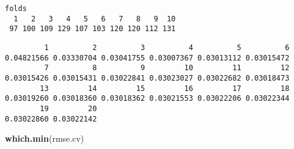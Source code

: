 \documentclass[]{article}
\newenvironment{Shaded}{\begin{snugshade}}{\end{snugshade}}
\newcommand{\KeywordTok}[1]{\textcolor[rgb]{0.13,0.29,0.53}{\textbf{#1}}}
\newcommand{\DataTypeTok}[1]{\textcolor[rgb]{0.13,0.29,0.53}{#1}}
\newcommand{\DecValTok}[1]{\textcolor[rgb]{0.00,0.00,0.81}{#1}}
\newcommand{\StringTok}[1]{\textcolor[rgb]{0.31,0.60,0.02}{#1}}
\newcommand{\OtherTok}[1]{\textcolor[rgb]{0.56,0.35,0.01}{#1}}
\newcommand{\ControlFlowTok}[1]{\textcolor[rgb]{0.13,0.29,0.53}{\textbf{#1}}}
\newcommand{\OperatorTok}[1]{\textcolor[rgb]{0.81,0.36,0.00}{\textbf{#1}}}
\newcommand{\NormalTok}[1]{#1}
\begin{document}
\begin{verbatim}
folds
  1   2   3   4   5   6   7   8   9  10 
 97 100 109 129 107 103 120 120 112 131 
\end{verbatim}

\begin{Shaded}
\end{Shaded}

\begin{verbatim}
         1          2          3          4          5          6 
0.04821566 0.03330704 0.03041755 0.03007367 0.03013112 0.03015472 
         7          8          9         10         11         12 
0.03015426 0.03015431 0.03022841 0.03023027 0.03022682 0.03018473 
        13         14         15         16         17         18 
0.03019260 0.03018360 0.03018362 0.03021553 0.03022206 0.03022344 
        19         20 
0.03022860 0.03022142 
\end{verbatim}

\begin{Shaded}
\begin{Highlighting}[]
\KeywordTok{which.min}\NormalTok{(rmse.cv)}
\end{Highlighting}
\end{Shaded}
\end{document}
